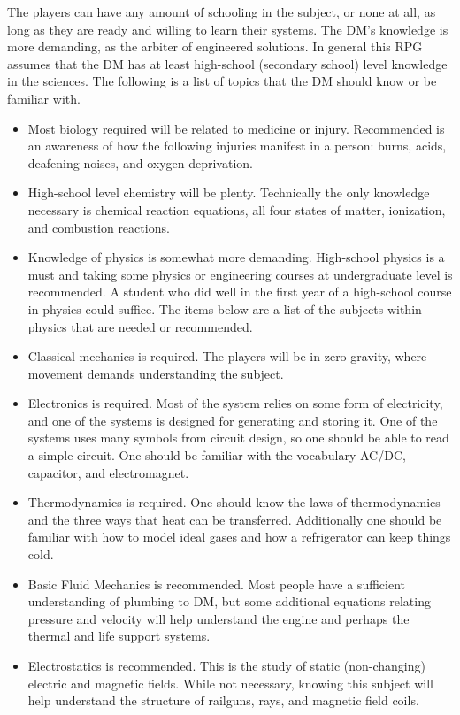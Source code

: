 \documentclass[a4paper]{article}
\begin{document}
The players can have any amount of schooling in the subject, or none at all, as long as they are ready and willing to learn their systems. The DM's knowledge is more demanding, as the arbiter of engineered solutions. In general this RPG assumes that the DM has at least high-school (secondary school) level knowledge in the sciences. The following is a list of topics that the DM should know or be familiar with.
\begin{itemize}
\item Most biology required will be related to medicine or injury. Recommended is an awareness of how the following injuries manifest in a person: burns, acids, deafening noises, and oxygen deprivation.
\item High-school level chemistry will be plenty. Technically the only knowledge necessary is chemical reaction equations, all four states of matter, ionization, and combustion reactions.
\item Knowledge of physics is somewhat more demanding. High-school physics is a must and taking some physics or engineering courses at undergraduate level is recommended. A student who did well in the first year of a high-school course in physics could suffice. The items below are a list of the subjects within physics that are needed or recommended. 
\item Classical mechanics is required. The players will be in zero-gravity, where movement demands understanding the subject.
\item Electronics is required. Most of the system relies on some form of electricity, and one of the systems is designed for generating and storing it. One of the systems uses many symbols from circuit design, so one should be able to read a simple circuit. One should be familiar with the vocabulary AC/DC, capacitor, and electromagnet.
\item Thermodynamics is required. One should know the laws of thermodynamics and the three ways that heat can be transferred. Additionally one should be familiar with how to model ideal gases and how a refrigerator can keep things cold.
\item Basic Fluid Mechanics is recommended. Most people have a sufficient understanding of plumbing to DM, but some additional equations relating pressure and velocity will help understand the engine and perhaps the thermal and life support systems.
\item Electrostatics is recommended. This is the study of static (non-changing) electric and magnetic fields. While not necessary, knowing this subject will help understand the structure of railguns, rays, and magnetic field coils.
\end{itemize}
\end{document}
